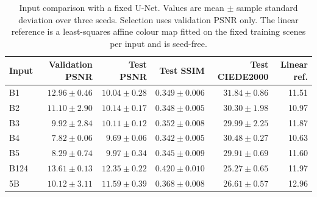 \begin{table}[htbp]
\centering
\caption{Input comparison with a fixed U-Net. Values are mean $\pm$ sample standard deviation over three seeds. Selection uses validation PSNR only. The linear reference is a least-squares affine colour map fitted on the fixed training scenes per input and is seed-free.}
\label{tab:input-results}
\small
\begin{tabular}{lrrrrr}
\toprule
Input & Validation PSNR & Test PSNR & Test SSIM & Test CIEDE2000 & Linear ref. \\
\midrule
B1 & $12.96\pm0.46$ & $10.04\pm0.28$ & $0.349\pm0.006$ & $31.84\pm0.86$ & 11.51 \\
B2 & $11.10\pm2.90$ & $10.14\pm0.17$ & $0.348\pm0.005$ & $30.30\pm1.98$ & 10.97 \\
B3 & $9.92\pm2.84$ & $10.11\pm0.12$ & $0.352\pm0.008$ & $29.99\pm2.25$ & 11.87 \\
B4 & $7.82\pm0.06$ & $9.69\pm0.06$ & $0.342\pm0.005$ & $30.48\pm0.27$ & 10.63 \\
B5 & $8.29\pm0.74$ & $9.97\pm0.34$ & $0.345\pm0.009$ & $29.91\pm0.69$ & 11.60 \\
B124 & $13.61\pm0.13$ & $12.35\pm0.22$ & $0.420\pm0.010$ & $25.27\pm0.65$ & 11.97 \\
5B & $10.12\pm3.11$ & $11.59\pm0.39$ & $0.368\pm0.008$ & $26.61\pm0.57$ & 12.96 \\
\bottomrule
\end{tabular}
\end{table}
